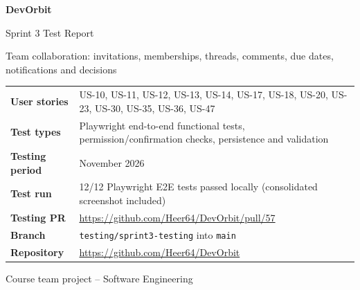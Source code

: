 \documentclass[11pt,a4paper]{article}
\begin{document}
\begin{titlepage}\centering\vspace*{2.5cm}
{\Huge\bfseries\color{accent} DevOrbit\par}\vspace{0.6cm}
{\LARGE Sprint 3 Test Report\par}\vspace{0.3cm}
{\Large Team collaboration: invitations, memberships, threads, comments, due dates, notifications and decisions\par}\vspace{1.5cm}
\begin{tabular}{>{\bfseries}l p{10cm}}
User stories & US-10, US-11, US-12, US-13, US-14, US-17, US-18, US-20, US-23, US-30, US-35, US-36, US-47 \\
Test types & Playwright end-to-end functional tests, permission/confirmation checks, persistence and validation \\
Testing period & November 2026 \\
Test run & 12/12 Playwright E2E tests passed locally (consolidated screenshot included) \\
Testing PR & \url{https://github.com/Heer64/DevOrbit/pull/57} \\
Branch & \texttt{testing/sprint3-testing} into \texttt{main} \\
Repository & \url{https://github.com/Heer64/DevOrbit} \\
\end{tabular}\vfill{\small Course team project -- Software Engineering\par}
\end{titlepage}
\tableofcontents\newpage
\end{document}
